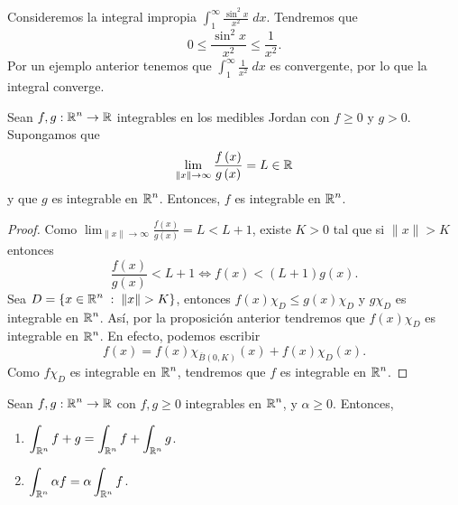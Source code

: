 \begin{eg}
Consideremos la integral impropia $\displaystyle \int^{\infty}_{1} \frac{\sin ^{2}x}{x^{2}} \; dx $. Tendremos que
\[0 \leq \frac{\sin ^{2}x}{x^{2}}\leq \frac{1}{x^{2}} .\]
Por un ejemplo anterior tenemos que $\displaystyle \int^{\infty}_{1} \frac{1}{x^{2}} \; dx $ es convergente, por lo que la integral converge. 
\end{eg}
\begin{prop}
Sean $\displaystyle f,g : \mathbb{R}^{n} \to \mathbb{R} $ integrables en los medibles Jordan con $\displaystyle f \geq 0 $ y $\displaystyle g > 0 $. Supongamos que 
\[\lim_{ \|x\| \to \infty}\frac{f\left(x\right)}{g\left(x\right)} = L \in \mathbb{R} \]
y que $\displaystyle g $ es integrable en $\displaystyle \mathbb{R}^{n} $. Entonces, $\displaystyle f $ es integrable en $\displaystyle \mathbb{R}^{n} $. 
\end{prop}
\begin{proof}
Como $\displaystyle \lim_{\|x\| \to \infty}\frac{f\left(x\right)}{g\left(x\right)}=L < L +1 $, existe $\displaystyle K > 0 $ tal que si $\displaystyle \|x\| > K $ entonces
\[\frac{f\left(x\right)}{g\left(x\right)}<L+1 \iff f\left(x\right) < \left(L+1\right)g\left(x\right) .\]
Sea $\displaystyle D = \left\{ x \in \mathbb{R}^{n} \; : \; \|x\| > K\right\}  $, entonces $\displaystyle f\left(x\right)\chi_{D} \leq g\left(x\right)\chi_{D} $ y $\displaystyle g\chi_{D} $ es integrable en $\displaystyle \mathbb{R}^{n} $. 
Así, por la proposición anterior tendremos que $\displaystyle f\left(x\right)\chi_{D} $ es integrable en $\displaystyle \mathbb{R}^{n} $. En efecto, podemos escribir
\[f\left(x\right)=f\left(x\right)\chi_{\overline{B}\left(0,K\right)}\left(x\right) + f\left(x\right)\chi_{D} \left(x\right).\]
Como $\displaystyle f\chi_{D} $ es integrable en $\displaystyle \mathbb{R}^{n} $, tendremos que $\displaystyle f $ es integrable en $\displaystyle \mathbb{R}^{n} $. 
\end{proof}
\begin{prop}[Linealidad]
Sean $\displaystyle f,g : \mathbb{R}^{n} \to \mathbb{R} $ con $\displaystyle f,g \geq 0 $ integrables en $\displaystyle \mathbb{R}^{n} $, y $\displaystyle \alpha \geq 0 $. Entonces,
\begin{enumerate}
\item $\displaystyle \int _{\mathbb{R}^{n}}f+g =\int _{\mathbb{R}^{n}}f +\int _{\mathbb{R}^{n}}g  $.
\item $\displaystyle \int _{\mathbb{R}^{n}}\alpha f = \alpha\int _{\mathbb{R}^{n}}f  $.
\end{enumerate}
\end{prop}
